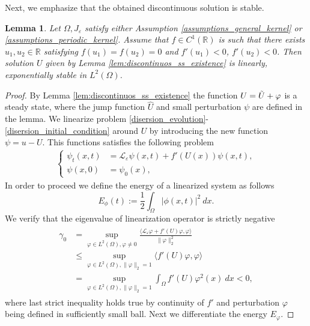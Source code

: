 \documentclass[12pt, a4paper]{article}
\theoremstyle{break}
\theoremstyle{break}
\theoremstyle{break}
\theoremstyle{break}
\newtheorem{lem}{Lemma}[section]
\theoremstyle{break}
\newcommand{\Leo}{\mathcal{L}_{\varepsilon}}
\newcommand{\Leb}{L^2\left(\Omega\right)}
\begin{document}
Next, we emphasize that the obtained discontinuous solution is stable.

\begin{lem}    
    Let $\Omega, J_\varepsilon$ satisfy either Assumption \ref{assumptions_general_kernel} or \ref{assumptions_periodic_kernel}. Assume that $f \in C^1(\mathbb{R})$ is such that there exists $u_1, u_2 \in \mathbb{R}$ satisfying $f(u_1) = f(u_2) = 0$ and $f'(u_1) < 0$, $f'(u_2) < 0$. Then solution $U$ given by Lemma \ref{lem:discontinuos_ss_existence} is linearly, exponentially stable in $L^2(\Omega)$.
    \label{lem:discontinuos_ss_stability}
\end{lem}

\begin{proof}
    By Lemma \ref{lem:discontinuos_ss_existence} the function $U = \Tilde{U} + \varphi$ is a steady state, where the jump function $\hat{U}$ and small perturbation $\psi$ are defined in the lemma. We linearize problem \eqref{disersion_evolution}-\eqref{disersion_initial_condition} around $U$ by introducing the new function $\psi = u - U$. This functions satisfies the following problem
    \begin{align*}
        \begin{cases}
            \psi_t(x,t) &= \Leo \psi(x,t) + f'(U(x))\psi(x,t), \\
            \psi(x,0) &= \psi_0(x),
        \end{cases}
    \end{align*}
    In order to proceed we define the energy of a linearized system as follows
    \begin{equation*}
        E_\phi(t) := \frac{1}{2} \int_\Omega |\phi(x,t)|^2 \:dx.
    \end{equation*}
    We verify that the eigenvalue of linearization operator is strictly negative
    \begin{align}
        \begin{split}
            \gamma_0 &= \sup_{\varphi \in \Leb, \varphi \neq 0} \frac{\langle \Leo \varphi + f'(U)\varphi, \varphi \rangle}{\|\varphi\|_2^2} \\
            &\leq \sup_{\varphi \in \Leb, \| \varphi \|_2 = 1} \langle f'(U)\varphi, \varphi \rangle \\
            &= \sup_{\varphi \in \Leb, \| \varphi \|_2 = 1} \int_\Omega f'(U) \varphi^2(x)\:dx < 0,
        \end{split}
        \label{gamma_0_negativity}
    \end{align}
    where last strict inequality holds true by continuity of $f'$ and perturbation $\varphi$ being defined in sufficiently small ball. Next we differentiate the energy $E_\varphi$.

\end{proof}
\end{document}
